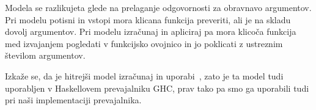 Modela se razlikujeta glede na prelaganje odgovornosti za obravnavo argumentov. Pri modelu potisni in vstopi mora klicana funkcija preveriti, ali je na skladu dovolj argumentov. Pri modelu izračunaj in apliciraj pa mora klicoča funkcija med izvajanjem pogledati v funkcijsko ovojnico in jo poklicati z ustreznim številom argumentov.

Izkaže se, da je hitrejši model izračunaj in uporabi~\cite{marlow2004making}, zato je ta model tudi uporabljen v Haskellovem prevajalniku GHC, prav tako pa smo ga uporabili tudi pri naši implementaciji prevajalnika.

